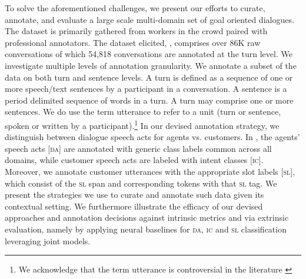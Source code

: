 To solve the aforementioned challenges, we present our efforts to curate, annotate, and evaluate a large scale multi-domain set of goal oriented dialogues.  The dataset is primarily gathered from workers in the crowd paired with professional annotators. The dataset elicited, \multidogo, comprises over 86K raw conversations of which 54,818 conversations are annotated at the turn level.  We investigate multiple levels of annotation granularity. We annotate a subset of the data on both turn and sentence levels. A turn is defined as a sequence of one or more speech/text sentences by a participant in a conversation. A sentence is a period delimited sequence of words in a turn. A turn may comprise one or more sentences. We do use the term  utterance to refer to a unit (turn or sentence, spoken or written by a participant).\footnote{ We acknowledge that the term utterance is controversial in the literature \citep{paretti18}} In our devised annotation strategy, we distinguish between dialogue speech acts for agents vs. customers. In \multidogo, the agents' speech acts   [\textsc{da}] are annotated with generic class labels common across all domains, while customer speech acts are labeled with  intent classes [\textsc{ic}]. Moreover, we annotate customer utterances with the appropriate slot labels [\textsc{sl}], which consist of the \textsc{sl} span and corresponding tokens with that \textsc{sl} tag. We present the strategies we use to curate and annotate such data given its contextual setting. We furthermore illustrate the efficacy of our devised approaches and annotation decisions against intrinsic metrics and via extrinsic evaluation, namely by applying neural baselines for \textsc{da}, \textsc{ic} and \textsc{sl} classification leveraging joint models. %